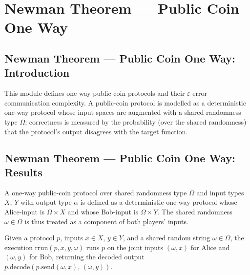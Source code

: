 \section{Newman Theorem --- Public Coin One Way}
\subsection*{Newman Theorem --- Public Coin One Way: Introduction}

This module defines one-way public-coin protocols and their $\varepsilon$-error
communication complexity.  A public-coin protocol is modelled as a deterministic
one-way protocol whose input spaces are augmented with a shared randomness type
$\Omega$; correctness is measured by the probability (over the shared randomness)
that the protocol's output disagrees with the target function.

\subsection*{Newman Theorem --- Public Coin One Way: Results}

\begin{definition}
\label{CommunicationComplexity.PublicCoin.OneWay.Protocol}
\leanok
{}
A one-way public-coin protocol over shared randomness type $\Omega$ and
input types $X$, $Y$ with output type $\alpha$ is defined as a deterministic
one-way protocol whose Alice-input is $\Omega \times X$ and whose Bob-input is
$\Omega \times Y$.  The shared randomness $\omega \in \Omega$ is thus treated as
a component of both players' inputs.
\end{definition}

\begin{definition}
\label{CommunicationComplexity.PublicCoin.OneWay.Protocol.rrun}
\leanok
{}
Given a protocol $p$, inputs $x \in X$, $y \in Y$, and a shared random string
$\omega \in \Omega$, the execution $\mathrm{rrun}(p, x, y, \omega)$ runs $p$ on
the joint inputs $(\omega, x)$ for Alice and $(\omega, y)$ for Bob, returning
the decoded output $p.\mathrm{decode}(p.\mathrm{send}(\omega, x),\,(\omega, y))$.
\end{definition}

